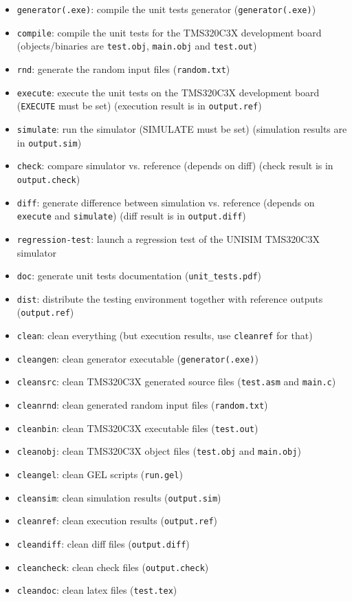 \begin{itemize}
\item \texttt{generator(.exe)}: compile the unit tests generator (\texttt{generator(.exe)})
\item \texttt{compile}: compile the unit tests for the TMS320C3X development board (objects/binaries are \texttt{test.obj}, \texttt{main.obj} and \texttt{test.out})
\item \texttt{rnd}: generate the random input files (\texttt{random.txt}) 
\item \texttt{execute}: execute the unit tests on the TMS320C3X development board (\texttt{EXECUTE} must be set) (execution result is in \texttt{output.ref})
\item \texttt{simulate}: run the simulator (SIMULATE must be set) (simulation results are in \texttt{output.sim})                                    
\item \texttt{check}: compare simulator vs. reference (depends on diff) (check result is in \texttt{output.check})
\item \texttt{diff}: generate difference between simulation vs. reference (depends on \texttt{execute} and \texttt{simulate}) (diff result is in \texttt{output.diff})
\item \texttt{regression-test}: launch a regression test of the UNISIM TMS320C3X simulator
\item \texttt{doc}: generate unit tests documentation (\texttt{unit\_tests.pdf})
\item \texttt{dist}: distribute the testing environment together with reference outputs (\texttt{output.ref})
\item \texttt{clean}: clean everything (but execution results, use \texttt{cleanref} for that)
\item \texttt{cleangen}: clean generator executable (\texttt{generator(.exe)})
\item \texttt{cleansrc}: clean TMS320C3X generated source files (\texttt{test.asm} and \texttt{main.c})
\item \texttt{cleanrnd}: clean generated random input files (\texttt{random.txt})
\item \texttt{cleanbin}: clean TMS320C3X executable files (\texttt{test.out})
\item \texttt{cleanobj}: clean TMS320C3X object files (\texttt{test.obj} and \texttt{main.obj})
\item \texttt{cleangel}: clean GEL scripts (\texttt{run.gel})
\item \texttt{cleansim}: clean simulation results (\texttt{output.sim})
\item \texttt{cleanref}: clean execution results (\texttt{output.ref})
\item \texttt{cleandiff}: clean diff files (\texttt{output.diff})
\item \texttt{cleancheck}: clean check files (\texttt{output.check})
\item \texttt{cleandoc}: clean latex files (\texttt{test.tex})
\end{itemize}

